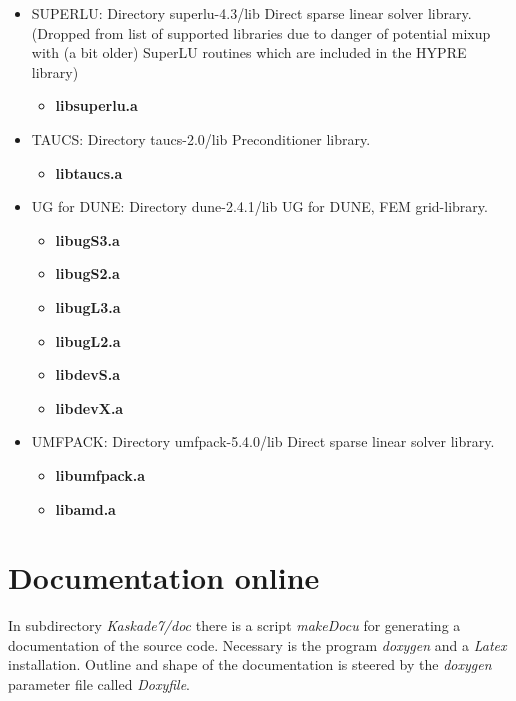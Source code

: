 \documentclass[11pt]{article}
\begin{document}
\begin{itemize}
\begin{itemize}
\end{itemize}
\item SUPERLU: Directory superlu-4.3/lib \newline
      Direct sparse linear solver library.\newline
      (Dropped from list of supported libraries due to danger of potential mixup with (a bit older) SuperLU routines which are included in the HYPRE library)
\begin{itemize}
\item  {\bf libsuperlu.a}
\end{itemize}
\item TAUCS: Directory taucs-2.0/lib \newline
      Preconditioner library.
\begin{itemize}
\item  {\bf libtaucs.a}
\end{itemize}
\item UG for DUNE: Directory dune-2.4.1/lib \newline
       UG for DUNE, FEM grid-library.
\begin{itemize}
\item  {\bf libugS3.a}
\item  {\bf libugS2.a}
\item  {\bf libugL3.a}
\item  {\bf libugL2.a}
\item  {\bf libdevS.a}
\item  {\bf libdevX.a}
\end{itemize}
\item UMFPACK: Directory umfpack-5.4.0/lib \newline
      Direct sparse linear solver library.
\begin{itemize}
\item  {\bf libumfpack.a}
\item  {\bf libamd.a}
\end{itemize}
\end{itemize} 

\section{Documentation online}\label{docu}
In subdirectory {\em Kaskade7/doc} there is a script {\em makeDocu} for generating a documentation 
of the source code. Necessary is the program {\em doxygen} and a {\em Latex} installation.
Outline and shape of the documentation is steered by the {\em doxygen} parameter file  called {\em Doxyfile}.
\end{document}

